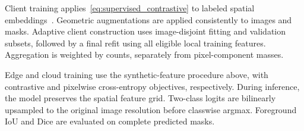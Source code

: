 Client training applies~\eqref{eq:supervised_contrastive} to labeled spatial embeddings~\cite{wang2021pixelcontrast}.
Geometric augmentations are applied consistently to images and masks. Adaptive client construction uses image-disjoint fitting and validation subsets, followed by a final refit using all eligible local training features.
Aggregation is weighted by counts, separately from pixel-component masses.

Edge and cloud training use the synthetic-feature procedure above, with contrastive and pixelwise cross-entropy objectives, respectively.
During inference, the model preserves
the spatial feature grid.
Two-class logits are bilinearly upsampled to the
original image resolution before classwise argmax.
Foreground IoU and Dice are evaluated on complete
predicted masks.